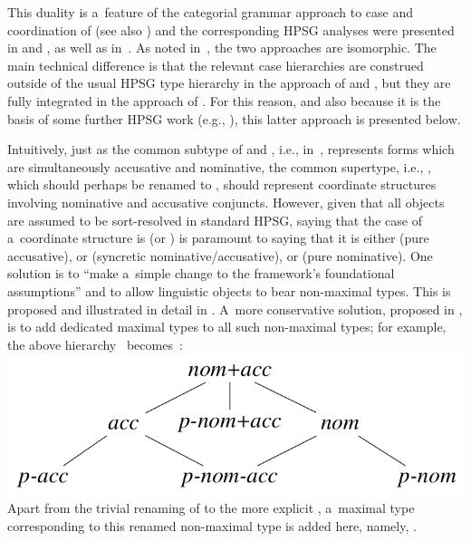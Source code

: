 \documentclass[output=paper]{langsci/langscibook}
\begin{document}
This duality is a~feature of the categorial grammar approach to case and coordination of \citealt{Bayer96} (see also \citealt{BJ95}) and the corresponding HPSG analyses were presented in \citealt{levy:01} and \citealt{lev:pol:01}, as well as in~\citealt{dani:01}.  As noted in~\citealt[233]{lev:pol:01}, the two approaches are isomorphic.  The main technical difference is that the relevant case hierarchies are construed outside of the usual HPSG type hierarchy in the approach of \citealt{levy:01} and \citealt{lev:pol:01}, but they are fully integrated in the approach of \citealt{dani:01}.  For this reason, and also because it is the basis of some further HPSG work (e.g., \citealt{Crysmann2005c}), this latter approach is presented below.

Intuitively, just as the common subtype of  and , i.e.,  in~, represents forms which are simultaneously accusative and nominative, the common supertype, i.e., , which should perhaps be renamed to , should represent coordinate structures involving nominative and accusative conjuncts.  However, given that all objects are assumed to be sort-resolved in standard HPSG, saying that the case of a~coordinate structure is  (or ) is paramount to saying that it is either  (pure accusative), or  (syncretic nominative/accusative), or  (pure nominative).  One solution is to “make a~simple change to the framework's foundational assumptions” \citep[268]{sag:02} and to allow linguistic objects to bear non-maximal types.  This is proposed and illustrated in detail in \citealt{sag:02}.  A~more conservative solution, proposed in \citealt{dani:01}, is to add dedicated maximal types to all such non-maximal types; for example, the above hierarchy~ becomes~:
\ea
\label{daniels20} \mbox{}\\\includegraphics[scale=.35]{figures/daniels20.png}
\z
Apart from the trivial renaming of  to the more explicit , a~maximal type corresponding to this renamed non-maximal type is added here, namely, .
\end{document}
